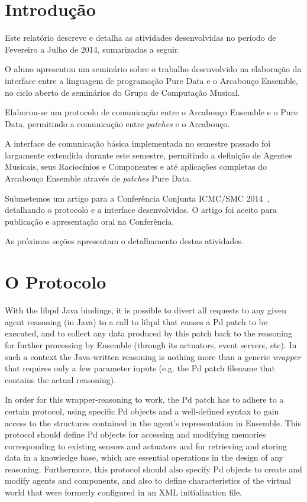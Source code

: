 \documentclass[a4paper, 11pt, twoside]{article}
\begin{document}
\begin{multicols}{2}

\section{Introdução}

Este relatório descreve e detalha as atividades desenvolvidas no período de 
Fevereiro a Julho de 2014, sumarizadas a seguir.

O aluno apresentou um seminário sobre o trabalho desenvolvido na elaboração da 
interface entre a linguagem de programação Pure Data e o Arcabouço Ensemble, 
no ciclo aberto de seminários do Grupo de Computação Musical.

Elaborou-se um protocolo de comunicação entre o Arcabouço Ensemble e o
Pure Data, permitindo a comunicação entre \textit{patches} e o Arcabouço.

A interface de comunicação básica implementada no semestre passado foi
largamente extendida durante este semestre, permitindo a definição de
Agentes Musicais, seus Raciocínios e Componentes e até aplicações
completas do Arcabouço Ensemble através de \textit{patches} Pure Data.

Submetemos um artigo para a Conferência Conjunta ICMC/SMC 2014~\cite{},
detalhando o protocolo e a interface desenvolvidos. O artigo foi aceito
para publicação e apresentação oral na Conferência.

As próximas seções apresentam o detalhamento destas atividades.

\section{O Protocolo}

With the libpd Java bindings, it is possible to divert all requests to any 
given agent reasoning (in Java) to a call to libpd that causes a Pd patch 
to be executed, and to collect any data produced by this patch back to 
the reasoning for further processing by Ensemble (through its actuators, 
event servers, etc). In such a context the Java-written reasoning is 
nothing more than a generic \emph{wrapper} that requires only a 
few parameter inputs (e.g. the Pd patch filename that contains 
the actual reasoning).

In order for this wrapper-reasoning to work, the Pd patch has to adhere to a 
certain protocol, using specific Pd objects and a well-defined syntax to 
gain access to the structures contained in the agent's representation in 
Ensemble. This protocol should define Pd objects for accessing and modifying 
memories corresponding to existing sensors and actuators and for retrieving 
and storing data in a knowledge base, which are essential operations in 
the design of any reasoning. Furthermore, this protocol should also specify 
Pd objects to create and modify agents and components, and also to define 
characteristics of the virtual world that were formerly configured 
in an XML initialization file.


\end{multicols}
\end{document}
